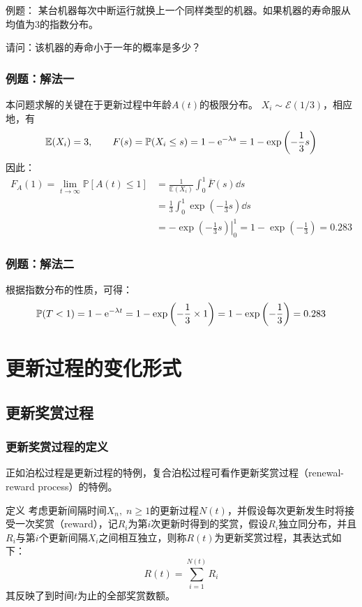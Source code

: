 \documentclass[t]{beamer}
\renewcommand{\Pr}{\mathbb{P}}
\newcommand{\E}{\mathbb{E}}
\begin{document}
\begin{frame}{例题：}
  某台机器每次中断运行就换上一个同样类型的机器。如果机器的寿命服从均值为3的指数分布。
    
  请问：该机器的寿命小于一年的概率是多少？
\end{frame}


\begin{frame}
  \frametitle{例题：解法一}
本问题求解的关键在于更新过程中年龄$A(t)$的极限分布。
$X_i\sim \mathcal{E}(1/3)$，相应地，有
\[\E(X_i)=3,\qquad F(s)=\Pr(X_i\le s)=1-{\rm e}^{-\lambda s}=1-\exp\left(-\frac{1}{3}s\right)\]
因此：
\[\begin{split}
  F_A(1)=\lim_{t\to\infty}\Pr[A(t)\le 1]&=\frac{1}{\E(X_i)}\int^1_0 \overline{F}(s)\dd s\\
  &=\frac{1}{3}\int^1_0 \exp\left(-\frac{1}{3}s\right)\dd s\\
  &= -\exp\left.\left(-\frac{1}{3}s\right)\right|^1_0=1-\exp\left(-\frac{1}{3}\right)=0.283
\end{split}
  \]
  

\end{frame}

\begin{frame}
  \frametitle{例题：解法二}
根据指数分布的性质，可得：
\[\Pr(T<1)=1-{\rm e}^{-\lambda t}=1-\exp\left(-\frac{1}{3}\times 1\right)=1-\exp\left(-\frac{1}{3}\right)=0.283\]
  

\end{frame}

\section{更新过程的变化形式}

\subsection{更新奖赏过程}

\begin{frame}
  \frametitle{更新奖赏过程的定义}
  正如泊松过程是更新过程的特例，复合泊松过程可看作更新奖赏过程（renewal-reward process）的特例。
  
\begin{block}{定义}
  考虑更新间隔时间$X_n,\; n\ge 1$的更新过程$N(t)$，并假设每次更新发生时将接受一次奖赏（reward），记$R_i$为第$i$次更新时得到的奖赏，假设$R_i$独立同分布，并且$R_i$与第$i$个更新间隔$X_i$之间相互独立，则称$R(t)$为更新奖赏过程，其表达式如下：
\begin{equation*}
    R(t)=\sum^{N(t)}_{i=1}R_i
\end{equation*}
其反映了到时间$t$为止的全部奖赏数额。
\end{block}
\end{frame}
\end{document}
